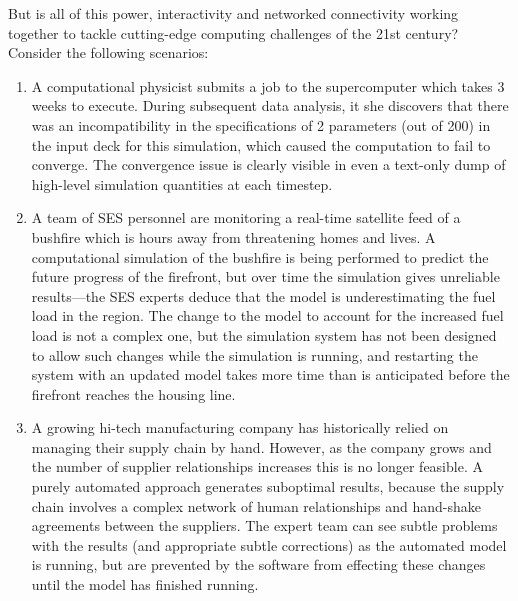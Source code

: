 \documentclass[a4paper]{scrartcl}
\begin{document}
But is all of this power, interactivity and networked connectivity
working together to tackle cutting-edge computing challenges of the
21st century? Consider the following scenarios:
\begin{enumerate}
\item A computational physicist submits a job to the supercomputer
  which takes 3 weeks to execute. During subsequent data analysis, it
  she discovers that there was an incompatibility in the
  specifications of 2 parameters (out of 200) in the input deck for
  this simulation, which caused the computation to fail to converge.
  The convergence issue is clearly visible in even a text-only dump of
  high-level simulation quantities at each timestep.


\item A team of SES personnel are monitoring a real-time satellite
  feed of a bushfire which is hours away from threatening homes and
  lives. A computational simulation of the bushfire is being performed
  to predict the future progress of the firefront, but over time the
  simulation gives unreliable results---the SES experts deduce that
  the model is underestimating the fuel load in the region. The change
  to the model to account for the increased fuel load is not a complex
  one, but the simulation system has not been designed to allow such
  changes while the simulation is running, and restarting the system
  with an updated model takes more time than is anticipated before the
  firefront reaches the housing line.

\item A growing hi-tech manufacturing company has historically relied
  on managing their supply chain by hand. However, as the company
  grows and the number of supplier relationships increases this is no
  longer feasible. A purely automated approach generates suboptimal
  results, because the supply chain involves a complex network of
  human relationships and hand-shake agreements between the suppliers.
  The expert team can see subtle problems with the results (and
  appropriate subtle corrections) as the automated model is running,
  but are prevented by the software from effecting these changes until
  the model has finished running.
\end{enumerate}
\end{document}
